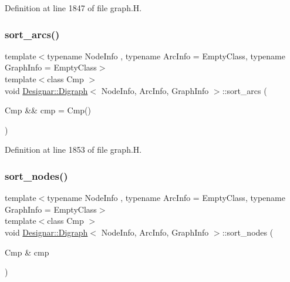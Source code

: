Definition at line 1847 of file graph.\+H.

\mbox{\label{class_designar_1_1_digraph_a44895030e02896d6d35277eec136c49f}} 
\subsubsection{\texorpdfstring{sort\+\_\+arcs()}{sort\_arcs()}\hspace{0.1cm}{\footnotesize\ttfamily [2/2]}}
{\footnotesize\ttfamily template$<$typename Node\+Info , typename Arc\+Info  = Empty\+Class, typename Graph\+Info  = Empty\+Class$>$ \\
template$<$class Cmp $>$ \\
void \hyperlink{class_designar_1_1_digraph}{Designar\+::\+Digraph}$<$ Node\+Info, Arc\+Info, Graph\+Info $>$\+::sort\+\_\+arcs (\begin{DoxyParamCaption}\item[{Cmp \&\&}]{cmp = {\ttfamily Cmp()} }\end{DoxyParamCaption})\hspace{0.3cm}{\ttfamily [inline]}}



Definition at line 1853 of file graph.\+H.

\mbox{\label{class_designar_1_1_digraph_a5d057854409452b7d4fb2f9eec217b7d}} 
\subsubsection{\texorpdfstring{sort\+\_\+nodes()}{sort\_nodes()}\hspace{0.1cm}{\footnotesize\ttfamily [1/2]}}
{\footnotesize\ttfamily template$<$typename Node\+Info , typename Arc\+Info  = Empty\+Class, typename Graph\+Info  = Empty\+Class$>$ \\
template$<$class Cmp $>$ \\
void \hyperlink{class_designar_1_1_digraph}{Designar\+::\+Digraph}$<$ Node\+Info, Arc\+Info, Graph\+Info $>$\+::sort\+\_\+nodes (\begin{DoxyParamCaption}\item[{Cmp \&}]{cmp }\end{DoxyParamCaption})\hspace{0.3cm}{\ttfamily [inline]}}



